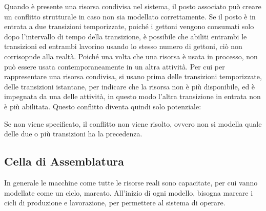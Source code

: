 \documentclass{article}
\numberwithin{equation}{subsection}
\begin{document}
Quando è presente una risorsa condivisa nel sistema, il posto associato può creare un conflitto strutturale in caso non sia modellato correttamente. Se il posto è in entrata 
a due transizioni temporizzate, poiché i gettoni vengono consumati solo dopo l'intervallo di tempo della transizione, è possibile che abiliti entrambi le transizioni ed 
entrambi lavorino usando lo stesso numero di gettoni, ciò non corrisopnde alla realtà. Poiché una volta che una risorsa è usata in processo, non può essere usata contemporaneamente 
in un altra attività. Per cui per rappresentare una risorsa condivisa, si usano prima delle transizioni temporizzate, delle transizioni istantane, per indicare che la 
risorsa non è più disponibile, ed è impegnata da una delle attività, in questo modo l'altra transizione in entrata non è più abilitata. Questo conflitto diventa quindi solo 
potenziale: 
\begin{center}
\end{center}

Se non viene specificato, il conflitto non viene risolto, ovvero non si modella quale delle due o più transizioni ha la precedenza. 

\subsection{Cella di Assemblatura}

In generale le macchine come tutte le risorse reali sono capacitate, per cui vanno modellate come un ciclo, marcato. All'inizio di ogni modello, bisogna marcare i cicli di 
produzione e lavorazione, per permettere al sistema di operare. 
\end{document}
